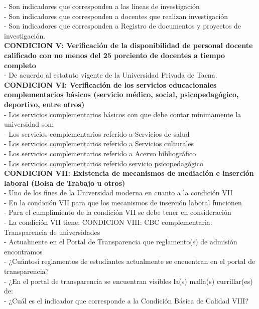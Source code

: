 -	Son indicadores que corresponden a las líneas de investigación\\
-	Son indicadores que corresponden a docentes que realizan investigación\\ 
-	Son indicadores que corresponden a Registro de documentos y proyectos de investigación.\\
\textbf{CONDICION V: Verificación de la disponibilidad de personal docente calificado con no menos del 25 porciento de docentes a tiempo completo}\\
-	De acuerdo al estatuto vigente de la Universidad Privada de Tacna.\\
\textbf{CONDICION VI: Verificación de los servicios educacionales complementarios básicos (servicio médico, social, psicopedagógico, deportivo, entre otros)}\\
-	Los servicios complementarios básicos con que debe contar mínimamente la universidad son: \\
-	Los servicios complementarios referido a Servicios de salud  \\
-	Los servicios complementarios referido a Servicios culturales  \\
-	Los servicios complementarios referido a Acervo bibliográfico \\
-	Los servicios complementarios referido servicio psicopedagógico\\
 \textbf{CONDICION VII: Existencia de mecanismos de mediación e inserción laboral (Bolsa de Trabajo u otros)}\\
-	Uno de los fines de la Universidad moderna en cuanto a la condición VII\\
-	En la condición VII para que los mecanismos de inserción laboral funcionen\\ 
-	Para el cumplimiento de la condición VII se debe tener en consideración\\
-	La condición VII tiene: CONDICION VIII: CBC complementaria: Transparencia de universidades\\ 
-	Actualmente en el Portal de Transparencia que reglamento(s) de admisión encontramos\\
-         ¿Cuántosi reglamentos de estudiantes actualmente se encuentran en el portal de transparencia?\\ 
-         ¿En el portal de transparencia se encuentran visibles la(s) malla(s) currillar(es) de: \\
-         ¿Cuál es el indicador que corresponde a la Condición Básica de Calidad VIII? \\
